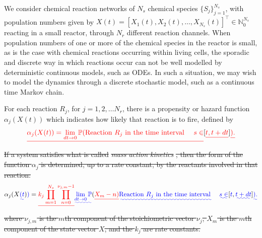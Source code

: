 \documentclass[final]{siamltex}
\providecommand{\DIFadd}[1]{{\protect\color{blue}\uwave{#1}}} %
\providecommand{\DIFdel}[1]{{\protect\color{red}\sout{#1}}}                      %
\providecommand{\DIFaddbegin}{} %
\providecommand{\DIFaddend}{} %
\providecommand{\DIFdelbegin}{} %
\providecommand{\DIFdelend}{} %
\newcommand{\DIFscaledelfig}{0.5}
\newlength{\DIFdelgraphicswidth} %
\newlength{\DIFdelgraphicsheight} %
\newcommand{\DIFaddincludegraphics}[2][]{{\color{blue}\fbox{\DIFOincludegraphics[#1]{#2}}}} %
\newcommand{\DIFdelincludegraphics}[2][]{%
\sbox{\DIFdelgraphicsbox}{\DIFOincludegraphics[#1]{#2}}%
\settoboxwidth{\DIFdelgraphicswidth}{\DIFdelgraphicsbox} %
\settoboxtotalheight{\DIFdelgraphicsheight}{\DIFdelgraphicsbox} %
\scalebox{\DIFscaledelfig}{%
\parbox[b]{\DIFdelgraphicswidth}{\usebox{\DIFdelgraphicsbox}\\[-\baselineskip] \rule{\DIFdelgraphicswidth}{0em}}\llap{\resizebox{\DIFdelgraphicswidth}{\DIFdelgraphicsheight}{%
\setlength{\unitlength}{\DIFdelgraphicswidth}%
\begin{picture}(1,1)%
\thicklines\linethickness{2pt} %
{\color[rgb]{1,0,0}\put(0,0){\framebox(1,1){}}}%
{\color[rgb]{1,0,0}\put(0,0){\line( 1,1){1}}}%
{\color[rgb]{1,0,0}\put(0,1){\line(1,-1){1}}}%
\end{picture}%
}\hspace*{3pt}}} %
} %
\DeclareRobustCommand{\DIFaddbegin}{\DIFOaddbegin \let\includegraphics\DIFaddincludegraphics} %
\DeclareRobustCommand{\DIFaddend}{\DIFOaddend \let\includegraphics\DIFOincludegraphics} %
\DeclareRobustCommand{\DIFdelbegin}{\DIFOdelbegin \let\includegraphics\DIFdelincludegraphics} %
\DeclareRobustCommand{\DIFdelend}{\DIFOaddend \let\includegraphics\DIFOincludegraphics} %
\begin{document}
We consider chemical reaction networks of $N_s$ chemical species $\{S_j\}_{j=1}^{N_s}$,
with population numbers given by $X(t) = [X_1(t), X_2(t), \ldots, X_{N_s}(t)]^\top \in
\mathbb{N}_0^{N_s}$ reacting in a small reactor, through $N_r$ different reaction
channels. When population numbers of one or more of the chemical
species in the reactor is small, as is the case with chemical
reactions occurring within living cells, the sporadic and discrete way
in which reactions occur can not be well modelled by deterministic
continuous models, such as ODEs. In such a situation, we may wish to
model the dynamics through a discrete stochastic model, such as a
continuous time Markov chain.

For each reaction $R_j$, for $j = 1,2,\ldots N_r$, there is a
propensity or hazard function $\alpha_j(X(t))$ which indicates how
likely that reaction is to fire, defined by
\DIFdelbegin \[\DIFdel{\alpha_j(X(t)) = \lim_{dt \to 0} \mathbb{P}(\text{Reaction $R_j$ in
    the time interval  } \quad s \in }[\DIFdel{t, t+ dt}] \DIFdel{).}\] %
\DIFdel{If a system
satisfies what is called }\emph{\DIFdel{mass action kinetics}}%
\DIFdel{, then the form of
the function $\alpha_j$ is determined, up to a rate constant, by the
reactants involved in that reaction:
}\DIFdelend \begin{equation}\DIFdelbegin %
\DIFdelend \alpha_j(X\DIFaddbegin \DIFadd{(t}\DIFaddend )\DIFaddbegin \DIFadd{) }\DIFaddend = \DIFdelbegin \DIFdel{k_j \prod_{m=1}^{N_s} \prod_{n=0}^{\nu_{j,m} -1} }\DIFdelend \DIFaddbegin \DIFadd{\lim_{dt \to 0} \mathbb{P}}\DIFaddend (\DIFdelbegin \DIFdel{X_m - n)}\DIFdelend \DIFaddbegin \DIFadd{\text{Reaction $R_j$ in
    the time interval  } }\quad \DIFadd{s \in }[\DIFadd{t}\DIFaddend , \DIFaddbegin \DIFadd{t+ dt}] \DIFadd{).}\DIFaddend \end{equation} \DIFdelbegin \DIFdel{where $\nu_{j,m}$ is the $m$th component of the stoichiometric vector
$\nu_j$, $X_m$ is the $m$th component of the state vector $X$, and the
$k_j$ are rate constants.
}\DIFdelend %
\end{document}
